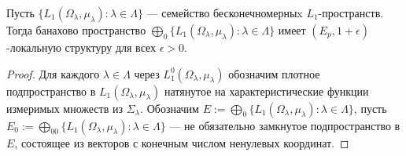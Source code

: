 \begin{proposition}\label{C0SumOfL1SpHaveDPP} Пусть $
\{L_1(\Omega_\lambda,\mu_\lambda):\lambda\in\Lambda \}$ --- семейство
бесконечномерныx $L_1$-пространств. Тогда банахово пространство $\bigoplus_0
\{L_1(\Omega_\lambda,\mu_\lambda):\lambda\in\Lambda \}$ имеет
$(E_p,1+\epsilon)$-локальную структуру для всех $\epsilon>0$.
\end{proposition}
\begin{proof} Для каждого $\lambda\in\Lambda$ через
$L_1^0(\Omega_\lambda,\mu_\lambda)$ обозначим плотное подпространство в
$L_1(\Omega_\lambda,\mu_\lambda)$ натянутое на характеристические функции
измеримых множеств из $\Sigma_\lambda$. Обозначим $E:=\bigoplus_0
\{L_1(\Omega_\lambda,\mu_\lambda):\lambda\in\Lambda \}$, пусть
$E_0:=\bigoplus_{00} \{L_1(\Omega_\lambda,\mu_\lambda):\lambda\in\Lambda \}$ ---
не обязательно замкнутое подпространство в $E$, состоящее из векторов с конечным
числом ненулевых координат.


\end{proof}
